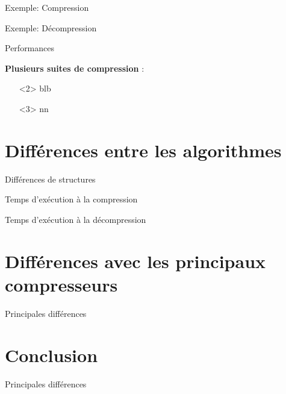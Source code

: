 \documentclass[french]{beamer}
\begin{document}
\begin{frame}{Exemple: Compression}
	\begin{center}
	\end{center}
\end{frame}
\begin{frame}{Exemple: Décompression}
	\begin{center}
	\end{center}
\end{frame}

\begin{frame}{Performances}
	\begin{center}
	\textbf{Plusieurs suites de compression} :
	\begin{itemize}
	\item[]<2>  	blb%
	\item[]<3>  	nn%
	\end{itemize}
	\end{center}
\end{frame}



\section{Différences entre les algorithmes}
\begin{frame}{Différences de structures}
	\begin{center}
	\end{center}
\end{frame}
\begin{frame}{Temps d'exécution à la compression} 
	\begin{center}
	\end{center}
\end{frame}
\begin{frame}{Temps d'exécution à la décompression}
	\begin{center}
	\end{center}
\end{frame}

\section{Différences avec les principaux compresseurs}
\begin{frame}{Principales différences}
	\begin{center}
	\end{center}
\end{frame}

\section{Conclusion}
\begin{frame}{Principales différences}
	\begin{center}
	\end{center}
\end{frame}
\end{document}
